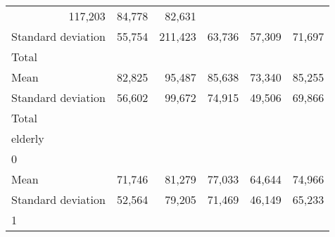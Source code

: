 \begin{tabular}{llllll}
  \multicolumn{1}{r}{117,203} &
  \multicolumn{1}{r}{84,778} &
  \multicolumn{1}{r}{82,631} \\
\multicolumn{1}{l}{\hspace{4em}Standard deviation} &
  \multicolumn{1}{|r}{55,754} &
  \multicolumn{1}{r}{211,423} &
  \multicolumn{1}{r}{63,736} &
  \multicolumn{1}{r}{57,309} &
  \multicolumn{1}{r}{71,697} \\
\multicolumn{1}{l}{\hspace{3em}Total} &
  \multicolumn{1}{|r}{} &
  \multicolumn{1}{r}{} &
  \multicolumn{1}{r}{} &
  \multicolumn{1}{r}{} &
  \multicolumn{1}{r}{} \\
\multicolumn{1}{l}{\hspace{4em}Mean} &
  \multicolumn{1}{|r}{82,825} &
  \multicolumn{1}{r}{95,487} &
  \multicolumn{1}{r}{85,638} &
  \multicolumn{1}{r}{73,340} &
  \multicolumn{1}{r}{85,255} \\
\multicolumn{1}{l}{\hspace{4em}Standard deviation} &
  \multicolumn{1}{|r}{56,602} &
  \multicolumn{1}{r}{99,672} &
  \multicolumn{1}{r}{74,915} &
  \multicolumn{1}{r}{49,506} &
  \multicolumn{1}{r}{69,866} \\
\multicolumn{1}{l}{\hspace{1em}Total} &
  \multicolumn{1}{|r}{} &
  \multicolumn{1}{r}{} &
  \multicolumn{1}{r}{} &
  \multicolumn{1}{r}{} &
  \multicolumn{1}{r}{} \\
\multicolumn{1}{l}{\hspace{2em}elderly} &
  \multicolumn{1}{|r}{} &
  \multicolumn{1}{r}{} &
  \multicolumn{1}{r}{} &
  \multicolumn{1}{r}{} &
  \multicolumn{1}{r}{} \\
\multicolumn{1}{l}{\hspace{3em}0} &
  \multicolumn{1}{|r}{} &
  \multicolumn{1}{r}{} &
  \multicolumn{1}{r}{} &
  \multicolumn{1}{r}{} &
  \multicolumn{1}{r}{} \\
\multicolumn{1}{l}{\hspace{4em}Mean} &
  \multicolumn{1}{|r}{71,746} &
  \multicolumn{1}{r}{81,279} &
  \multicolumn{1}{r}{77,033} &
  \multicolumn{1}{r}{64,644} &
  \multicolumn{1}{r}{74,966} \\
\multicolumn{1}{l}{\hspace{4em}Standard deviation} &
  \multicolumn{1}{|r}{52,564} &
  \multicolumn{1}{r}{79,205} &
  \multicolumn{1}{r}{71,469} &
  \multicolumn{1}{r}{46,149} &
  \multicolumn{1}{r}{65,233} \\
\multicolumn{1}{l}{\hspace{3em}1} &

\end{tabular}
